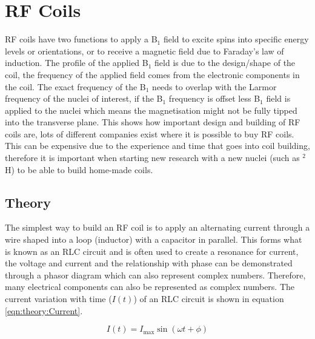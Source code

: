 
\section{RF Coils}

\ac{RF} coils have two functions to apply a B$_1$ field to excite spins into specific energy levels or orientations, or to receive a magnetic field due to Faraday's law of induction. The profile of the applied B$_1$ field is due to the design/shape of the coil, the frequency of the applied field comes from the electronic components in the coil. The exact frequency of the B$_1$ needs to overlap with the Larmor frequency of the nuclei of interest, if the B$_1$ frequency is offset less B$_1$ field is applied to the nuclei which means the magnetisation might not be fully tipped into the transverse plane. This shows how important design and building of \ac{RF} coils are, lots of different companies exist where it is possible to buy \ac{RF} coils. This can be expensive due to the experience and time that goes into coil building, therefore it is important when starting new research with a new nuclei (such as $^2$H) to be able to build home-made coils. 

\subsection{Theory}

The simplest way to build an \ac{RF} coil is to apply an alternating current through a wire shaped into a loop (inductor) with a capacitor in parallel. This forms what is known as an RLC circuit and is often used to create a resonance for current, the voltage and current and the relationship with phase can be demonstrated through a phasor diagram which can also represent complex numbers. Therefore, many electrical components can also be represented as complex numbers. The current variation with time ($I(t)$) of an RLC circuit is shown in equation \ref{eqn:theory:Current}.

\begin{equation}
    I(t) = I_{\mathrm{max}}\sin(\omega t + \phi)
    \label{eqn:theory:Current}
\end{equation}

